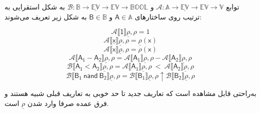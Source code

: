 \begin{defn}
	توابع 
	$\mathcal{A}:\mathbb{A}\rightarrow \mathbb{\underline{EV}} \rightarrow
	\mathbb{EV} \rightarrow \mathbb{V}$
	و 
	$\mathcal{B}:\mathbb{B}\rightarrow \mathbb{\underline{EV}} \rightarrow
	\mathbb{EV} \rightarrow \mathbb{BOOL}$
	به شکل استقرایی به ترتیب روی ساختارهای 
	$\mathsf{A}\in\mathbb{A}$
	و
	$\mathsf{B} \in \mathbb{B}$
	به شکل زیر تعریف می‌شوند:
	
	
$$\mathcal{A}\llbracket\mathsf{1}\rrbracket\underline{\rho},\rho=1$$
$$\mathcal{A}\llbracket\mathsf{\underline{\mathsf{x}}}\rrbracket\underline{\rho},\rho= \underline{\rho}(\mathsf{x})$$
$$\mathcal{A}\llbracket\mathsf{\mathsf{x}}\rrbracket\underline{\rho},\rho= \rho(\mathsf{x})$$
$$\mathcal{A}\llbracket\mathsf{A_1 - A_2}\rrbracket\underline{\rho},\rho= 
\mathcal{A}\llbracket\mathsf{A_1}\rrbracket\underline{\rho},\rho - \mathcal{A}\llbracket\mathsf{A_2}\rrbracket\underline{\rho},\rho$$
$$\mathcal{B}\llbracket\mathsf{A_1 < A_2}\rrbracket\underline{\rho},\rho=
	\mathcal{A}\llbracket\mathsf{A_1}\rrbracket\underline{\rho},\rho\: <\: \mathcal{A}\llbracket\mathsf{A_2}\rrbracket\underline{\rho},\rho$$
$$\mathcal{B}\llbracket\mathsf{B_1\:nand\:B_2}\rrbracket\underline{\rho},\rho=
\mathcal{B}\llbracket\mathsf{B_1}\rrbracket\underline{\rho},\rho \uparrow 
\mathcal{B}\llbracket\mathsf{B_2}\rrbracket\underline{\rho},\rho $$
\end{defn}
به‌راحتی قابل مشاهده است که تعاریف جدید تا حد خوبی به تعاریف قبلی شبیه هستند و فرق عمده صرفا وارد شدن $\underline{\rho}$ است.\\

